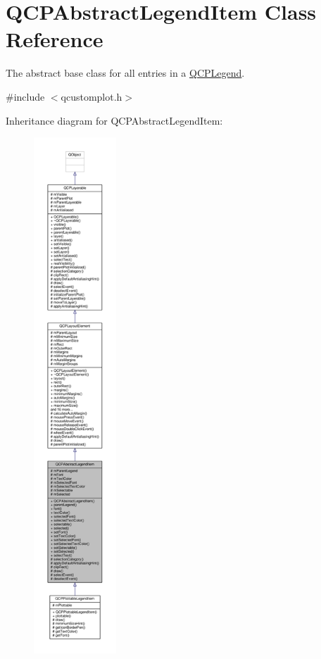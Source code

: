 \hypertarget{class_q_c_p_abstract_legend_item}{}\section{Q\+C\+P\+Abstract\+Legend\+Item Class Reference}
\label{class_q_c_p_abstract_legend_item}


The abstract base class for all entries in a \hyperlink{class_q_c_p_legend}{Q\+C\+P\+Legend}.  




{\ttfamily \#include $<$qcustomplot.\+h$>$}



Inheritance diagram for Q\+C\+P\+Abstract\+Legend\+Item\+:\nopagebreak
\begin{figure}[H]
\begin{center}
\leavevmode
\includegraphics[height=550pt]{class_q_c_p_abstract_legend_item__inherit__graph}
\end{center}
\end{figure}


